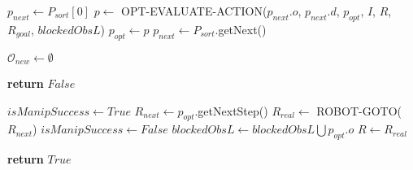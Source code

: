 \begin{algorithm}[H]
\begin{algorithmic}[1]
              \State $p_{next} \gets P_{sort}[0]$
                \State $p \gets$ OPT-EVALUATE-ACTION($p_{next}.o$, $p_{next}.d$, $p_{opt}$, $I$, $R$, $R_{goal}$, $blockedObsL$) \label{lst:line:suppcondition}
                  \State $p_{opt} \gets p$
                \EndIf
                \State $p_{next} \gets P_{sort}$.getNext()
              \EndWhile
            \EndIf \label{lst:line:01_obstacle evaluation_loop_2}


  \end{algorithmic}

\end{algorithm}

\begin{algorithm}[H]

  \label{alg:01-wu-optimized-part2}

  \begin{algorithmic}[1]


            \State $\mathcal{O}_{new} \gets \emptyset$ \label{lst:line:01_plan_execution_loop_3}

          \EndIf
           \label{lst:line:stop_condition_note}
            \State \textbf{return} $False$
          \EndIf

          \State $isManipSuccess \gets True$ \label{lst:line:plan_following_note_1}
          \State $R_{next} \gets p_{opt}$.getNextStep()
          \State $R_{real} \gets$ ROBOT-GOTO($R_{next}$)
            \State $isManipSuccess \gets False$
            \State $blockedObsL \gets blockedObsL \bigcup p_{opt}.o$
          \EndIf
          \State $R \gets R_{real}$ \label{lst:line:plan_following_note_2}

        \EndWhile

        \State \textbf{return} $True$ \label{lst:line:01_plan_execution_loop_4}

    \EndProcedure

  \end{algorithmic}

\end{algorithm}
